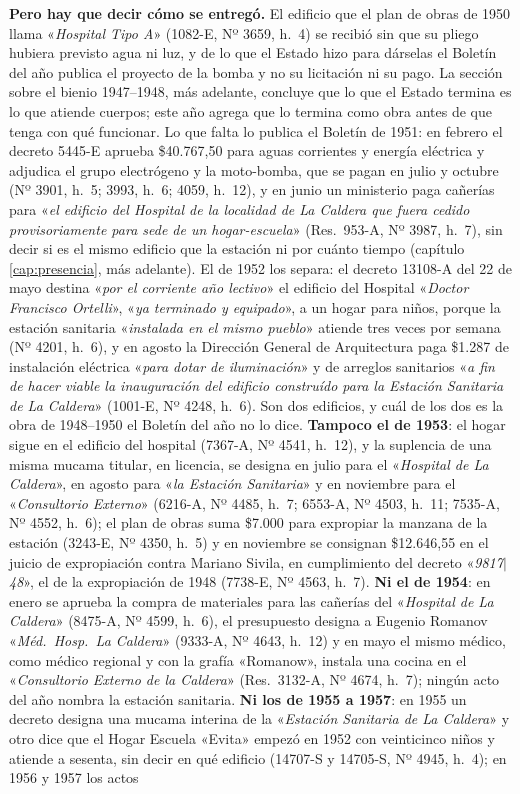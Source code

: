 \begin{cautela}
\textbf{Pero hay que decir cómo se entregó.} El edificio que el plan de obras de 1950 llama
«\textit{Hospital Tipo A}» (1082-E, Nº 3659, h.\ 4) se recibió sin que su pliego hubiera previsto
agua ni luz, y de lo que el Estado hizo para dárselas el Boletín del año publica el proyecto de la
bomba y no su licitación ni su pago. La sección sobre el bienio 1947--1948, más adelante, concluye
que lo que el Estado termina es lo que atiende cuerpos; este año agrega que lo termina como obra
antes de que tenga con qué funcionar. Lo que falta lo publica el Boletín de 1951: en febrero el decreto 5445-E aprueba \$40.767,50 para aguas corrientes y energía eléctrica y adjudica el grupo electrógeno y la moto-bomba, que se pagan en julio y octubre (Nº 3901, h.\ 5; 3993, h.\ 6; 4059, h.\ 12), y en junio un ministerio paga cañerías para «\textit{el edificio del Hospital de la localidad de La Caldera que fuera cedido provisoriamente para sede de un hogar-escuela}» (Res.\ 953-A, Nº 3987, h.\ 7), sin decir si es el mismo edificio que la estación ni por cuánto tiempo (capítulo \ref{cap:presencia}, más adelante). El de 1952 los separa: el decreto 13108-A del 22 de mayo destina «\textit{por el corriente año lectivo}» el edificio del Hospital «\textit{Doctor Francisco Ortelli}», «\textit{ya terminado y equipado}», a un hogar para niños, porque la estación sanitaria «\textit{instalada en el mismo pueblo}» atiende tres veces por semana (Nº 4201, h.\ 6), y en agosto la Dirección General de Arquitectura paga \$1.287 de instalación eléctrica «\textit{para dotar de iluminación}» y de arreglos sanitarios «\textit{a fin de hacer viable la inauguración del edificio construído para la Estación Sanitaria de La Caldera}» (1001-E, Nº 4248, h.\ 6). Son dos edificios, y cuál de los dos es la obra de 1948--1950 el Boletín del año no lo dice. \textbf{Tampoco el de 1953}: el hogar sigue en el edificio del hospital (7367-A, Nº 4541, h.\ 12), y la suplencia de una misma mucama titular, en licencia, se designa en julio para el «\textit{Hospital de La Caldera}», en agosto para «\textit{la Estación Sanitaria}» y en noviembre para el «\textit{Consultorio Externo}» (6216-A, Nº 4485, h.\ 7; 6553-A, Nº 4503, h.\ 11; 7535-A, Nº 4552, h.\ 6); el plan de obras suma \$7.000 para expropiar la manzana de la estación (3243-E, Nº 4350, h.\ 5) y en noviembre se consignan \$12.646,55 en el juicio de expropiación contra Mariano Sivila, en cumplimiento del decreto «\textit{9817$|$48}», el de la expropiación de 1948 (7738-E, Nº 4563, h.\ 7). \textbf{Ni el de 1954}: en enero se aprueba la compra de materiales para las cañerías del «\textit{Hospital de La Caldera}» (8475-A, Nº 4599, h.\ 6), el presupuesto designa a Eugenio Romanov «\textit{Méd.\ Hosp.\ La Caldera}» (9333-A, Nº 4643, h.\ 12) y en mayo el mismo médico, como médico regional y con la grafía «Romanow», instala una cocina en el «\textit{Consultorio Externo de la Caldera}» (Res.\ 3132-A, Nº 4674, h.\ 7); ningún acto del año nombra la estación sanitaria. \textbf{Ni los de 1955 a 1957}: en 1955 un decreto designa una mucama interina de la «\textit{Estación Sanitaria de La Caldera}» y otro dice que el Hogar Escuela «Evita» empezó en 1952 con veinticinco niños y atiende a sesenta, sin decir en qué edificio (14707-S y 14705-S, Nº 4945, h.\ 4); en 1956 y 1957 los actos 
\end{cautela}
